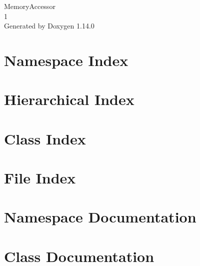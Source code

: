 \documentclass[twoside]{book}
\newcommand{\+}{\discretionary{\mbox{\scriptsize$\hookleftarrow$}}{}{}}
\newcommand{\clearemptydoublepage}{%
    \newpage{\pagestyle{empty}\cleardoublepage}%
  }
\begin{document}
  \raggedbottom
    \hypersetup{pageanchor=false,
                bookmarksnumbered=true,
                pdfencoding=unicode
               }
  \begin{titlepage}
  \vspace*{7cm}
  \begin{center}%
  {\Large Memory\+Accessor}\\
  [1ex]\large 1 \\
  \vspace*{1cm}
  {\large Generated by Doxygen 1.14.0}\\
  \end{center}
  \end{titlepage}
  \clearemptydoublepage
  \tableofcontents
  \clearemptydoublepage
  \hypersetup{pageanchor=true}
\chapter{Namespace Index}

\chapter{Hierarchical Index}

\chapter{Class Index}

\chapter{File Index}

\chapter{Namespace Documentation}

\chapter{Class Documentation}




















\end{document}
